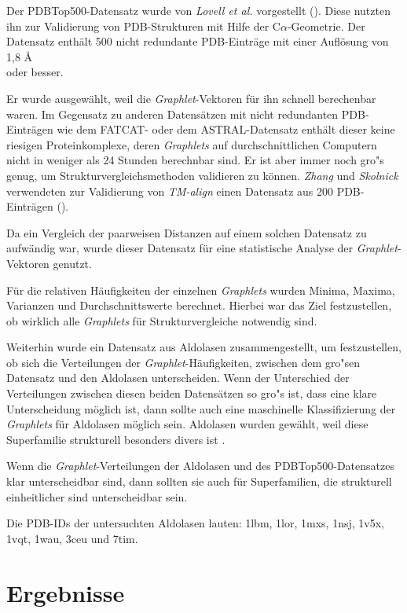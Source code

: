 \documentclass{report}
\begin{document}
Der PDBTop500-Datensatz wurde von \textit{Lovell et al.} vorgestellt (\cite{top500}). Diese nutzten ihn zur Validierung von PDB-Strukturen mit Hilfe der C$\alpha$-Geometrie.
Der Datensatz enth\"alt 500 nicht redundante PDB-Eintr\"age mit einer Aufl\"osung von 1,8 \AA \\
oder besser.

Er wurde ausgew\"ahlt, weil die \textit{Graphlet}-Vektoren f\"ur ihn schnell berechenbar waren. Im Gegensatz zu anderen Datens\"atzen mit nicht redundanten PDB-Eintr\"agen wie dem FATCAT- oder dem ASTRAL-Datensatz enth\"alt dieser keine riesigen Proteinkomplexe, deren \textit{Graphlets} auf durchschnittlichen Computern nicht in weniger als 24 Stunden berechnbar sind. 
Er ist aber immer noch gro"s genug, um Strukturvergleichsmethoden validieren zu k\"onnen. \textit{Zhang} und \textit{Skolnick} verwendeten zur Validierung von \textit{TM-align} einen Datensatz aus 200 PDB-Eintr\"agen (\cite{zhangtm}).

Da ein Vergleich der paarweisen Distanzen auf einem solchen Datensatz zu aufw\"andig war, wurde dieser Datensatz f\"ur eine statistische Analyse der \textit{Graphlet}-Vektoren genutzt.

F\"ur die relativen H\"aufigkeiten der einzelnen \textit{Graphlets} wurden Minima, Maxima, Varianzen und Durchschnittswerte berechnet. Hierbei war das Ziel festzustellen, ob wirklich alle \textit{Graphlets} f\"ur Strukturvergleiche notwendig sind.

Weiterhin wurde ein Datensatz aus Aldolasen zusammengestellt, um festzustellen, ob sich die Verteilungen der \textit{Graphlet}-H\"aufigkeiten, zwischen dem gro"sen Datensatz und den Aldolasen unterscheiden. Wenn der Unterschied der Verteilungen zwischen diesen beiden Datens\"atzen so gro"s ist, dass eine klare Unterscheidung m\"oglich ist, dann sollte auch eine maschinelle Klassifizierung der \textit{Graphlets} f\"ur Aldolasen m\"oglich sein. Aldolasen wurden gew\"ahlt, weil diese Superfamilie strukturell besonders divers ist \cite{das2015diversity}.

Wenn die \textit{Graphlet}-Verteilungen der Aldolasen und des PDBTop500-Datensatzes klar unterscheidbar sind, dann sollten sie auch f\"ur Superfamilien, die strukturell einheitlicher sind unterscheidbar sein.

Die PDB-IDs der untersuchten Aldolasen lauten: 1lbm, 1lor, 1mxs, 1nsj, 1v5x, 1vqt, 1wau, 3ceu und 7tim.



\chapter{Ergebnisse}
\end{document}

